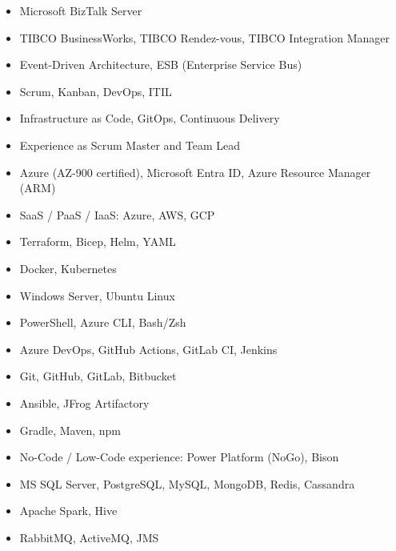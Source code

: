 \begin{cvcolumns}
        {\begin{itemize}
            \item Microsoft BizTalk Server
            \item TIBCO BusinessWorks, TIBCO Rendez-vous, TIBCO Integration Manager
            \item Event-Driven Architecture, ESB (Enterprise Service Bus)
        \end{itemize}}
        {\begin{itemize}
            \item Scrum, Kanban, DevOps, ITIL
            \item Infrastructure as Code, GitOps, Continuous Delivery
            \item Experience as Scrum Master and Team Lead
        \end{itemize}}
\end{cvcolumns}


{\begin{itemize}
    \item Azure (AZ-900 certified), Microsoft Entra ID, Azure Resource Manager (ARM)
    \item SaaS / PaaS / IaaS: Azure, AWS, GCP
    \item Terraform, Bicep, Helm, YAML
    \item Docker, Kubernetes
    \item Windows Server, Ubuntu Linux
    \item PowerShell, Azure CLI, Bash/Zsh
\end{itemize}}

{\begin{itemize}
    \item Azure DevOps, GitHub Actions, GitLab CI, Jenkins
    \item Git, GitHub, GitLab, Bitbucket
    \item Ansible, JFrog Artifactory
    \item Gradle, Maven, npm
    \item No-Code / Low-Code experience: Power Platform (NoGo), Bison
\end{itemize}}



{\begin{itemize}
    \item MS SQL Server, PostgreSQL, MySQL, MongoDB, Redis, Cassandra
    \item Apache Spark, Hive
    \item RabbitMQ, ActiveMQ, JMS
\end{itemize}}

